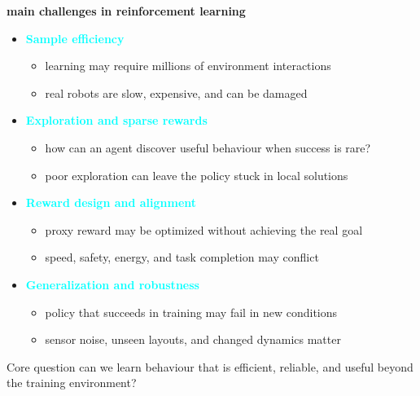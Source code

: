 \documentclass[xcolor=dvipsnames]{beamer}
\begin{document}
\begin{frame}{\bf main challenges in reinforcement learning}
  \small
  \begin{itemize}
    \item \textbf{\textcolor{cyan}{Sample efficiency}}
      \begin{itemize}
        \item learning may require millions of environment interactions
        \item real robots are slow, expensive, and can be damaged
      \end{itemize}
    \vspace{0.12cm}
    \item \textbf{\textcolor{cyan}{Exploration and sparse rewards}}
      \begin{itemize}
        \item how can an agent discover useful behaviour when success is rare?
        \item poor exploration can leave the policy stuck in local solutions
      \end{itemize}
    \vspace{0.12cm}
    \item \textbf{\textcolor{cyan}{Reward design and alignment}}
      \begin{itemize}
        \item proxy reward may be optimized without achieving the real goal
        \item speed, safety, energy, and task completion may conflict
      \end{itemize}
    \vspace{0.12cm}
    \item \textbf{\textcolor{cyan}{Generalization and robustness}}
      \begin{itemize}
        \item policy that succeeds in training may fail in new conditions
        \item sensor noise, unseen layouts, and changed dynamics matter
      \end{itemize}
  \end{itemize}
  \vspace{0.1cm}
  \begin{alertblock}{Core question}
    can we learn behaviour that is efficient, reliable, and useful beyond the training environment?
  \end{alertblock}
\end{frame}
\end{document}
